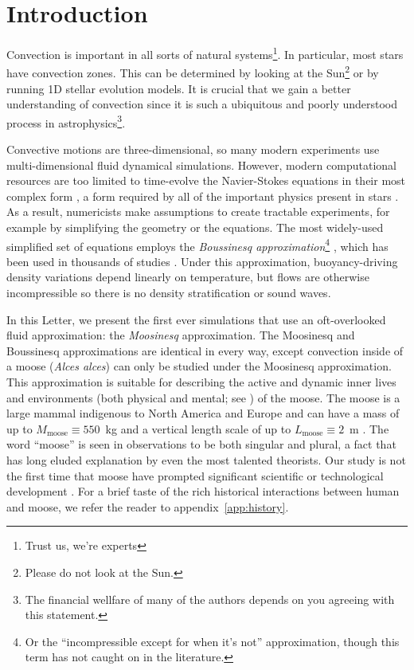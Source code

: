 \section{Introduction}
\label{sec:introduction}

Convection is important in all sorts of natural systems\footnote{Trust us, we're experts}.
In particular, most stars have convection zones.
This can be determined by looking at the Sun\footnote{Please do not look at the Sun.} or by running 1D stellar evolution models.
It is crucial that we gain a better understanding of convection since it is such a ubiquitous and poorly understood process in astrophysics\footnote{The financial wellfare of many of the authors depends on you agreeing with this statement.}.

Convective motions are three-dimensional, so many modern experiments use multi-dimensional fluid dynamical simulations.
However, modern computational resources are too limited to time-evolve the Navier-Stokes equations in their most complex form \citep{landau}, a form required by all of the important physics present in stars \citep{Paxton2011, Paxton2013, Paxton2015, Paxton2018, Paxton2019}.
As a result, numericists make assumptions to create tractable experiments, for example by simplifying the geometry or the equations.
The most widely-used simplified set of equations employs the \emph{Boussinesq approximation}\footnote{Or the ``incompressible except for when it's not'' approximation, though this term has not caught on in the literature.} \citep{spiegel_veronis_1960}, which has been used in thousands of studies \citep[see e.g.,][]{ahlers_etal_2009}.
Under this approximation, buoyancy-driving density variations depend linearly on temperature, but flows are otherwise incompressible so there is no density stratification or sound waves.

In this Letter, we present the first ever simulations that use an oft-overlooked fluid approximation: the \emph{Moosinesq} approximation.
The Moosinesq and Boussinesq approximations are identical in every way, except convection inside of a moose (\emph{Alces alces}) can only be studied under the Moosinesq approximation.
This approximation is suitable for describing the active and dynamic inner lives and environments (both physical and mental; see \citealp{Gibson2015}) of the moose.
The moose is a large mammal indigenous to North America and Europe and can have a mass of up to $M_\mathrm{moose}\equiv 550$~kg and a vertical length scale of up to $L_\mathrm{moose} \equiv 2$~m \citep{CPWmoose}.
The word ``moose'' is seen in observations to be both singular and plural, a fact that has long eluded explanation by even the most talented theorists.
Our study is not the first time that moose have prompted significant scientific or technological development \citep[see, e.g.,][]{Handel2009}.
For a brief taste of the rich historical interactions between human and moose, we refer the reader to appendix~\ref{app:history}.

